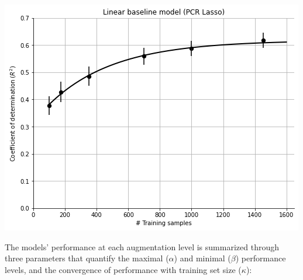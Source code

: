 \documentclass[a0paper,landscape,fontscale=0.365]{baposter}
\newenvironment{Figure}
  {\par\medskip\noindent\minipage{\linewidth}}
  {\endminipage\par\medskip}
\begin{document}
\begin{poster}
{\begin{multicols}{4}
    \columnbreak
    \begin{Figure}
        \centering
        \includegraphics[width=1.0\linewidth]{figures/curves_pcrlasso}
    \end{Figure}
    \columnbreak

\end{multicols}

The models' performance at each augmentation level is summarized through three parameters that quantify the maximal ($\alpha$) and minimal ($\beta$) performance levels, and the convergence of performance with training set size ($\kappa$):

}
\end{poster}
\end{document}

